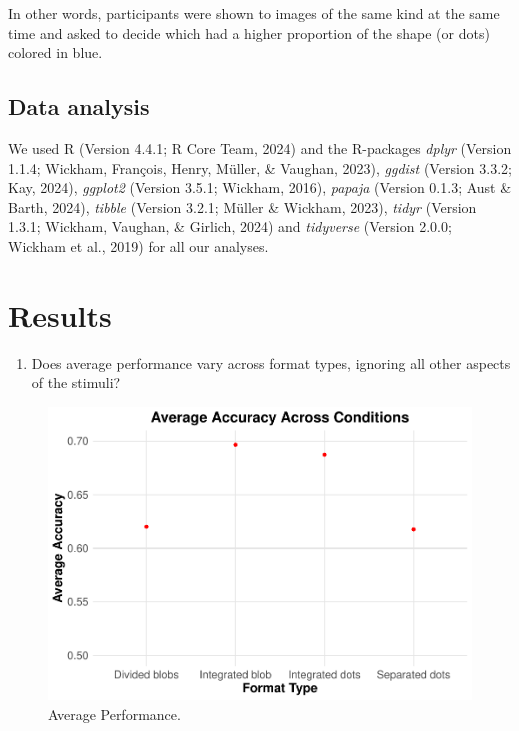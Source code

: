 \documentclass[
  man,floatsintext]{apa6}
\providecommand{\tightlist}{%
  \setlength{\itemsep}{0pt}\setlength{\parskip}{0pt}}
\begin{document}
In other words, participants were shown to images of the same kind at the same time and asked to decide which had a higher proportion of the shape (or dots) colored in blue.

\subsection{Data analysis}\label{data-analysis}

We used R (Version 4.4.1; R Core Team, 2024) and the R-packages \emph{dplyr} (Version 1.1.4; Wickham, François, Henry, Müller, \& Vaughan, 2023), \emph{ggdist} (Version 3.3.2; Kay, 2024), \emph{ggplot2} (Version 3.5.1; Wickham, 2016), \emph{papaja} (Version 0.1.3; Aust \& Barth, 2024), \emph{tibble} (Version 3.2.1; Müller \& Wickham, 2023), \emph{tidyr} (Version 1.3.1; Wickham, Vaughan, \& Girlich, 2024) and \emph{tidyverse} (Version 2.0.0; Wickham et al., 2019) for all our analyses.

\newpage

\section{Results}\label{results}

\begin{enumerate}
\def\labelenumi{\arabic{enumi}.}
\tightlist
\item
  Does average performance vary across format types, ignoring all other aspects of the stimuli?
\end{enumerate}

\begin{figure}
\centering
\includegraphics{Choudhary_WA11_files/figure-latex/performance-plot-1.pdf}
\caption{\label{fig:performance-plot}Average Performance.}
\end{figure}
\end{document}
